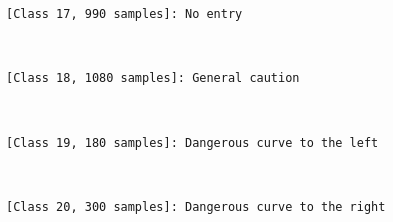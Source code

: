 \documentclass[11pt]{article}
\begin{document}
    \begin{Verbatim}[commandchars=\\\{\}]
[Class 17, 990 samples]: No entry

    \end{Verbatim}

    \begin{center}
    \end{center}
    { \hspace*{\fill} \\}
    
    \begin{Verbatim}[commandchars=\\\{\}]
[Class 18, 1080 samples]: General caution

    \end{Verbatim}

    \begin{center}
    \end{center}
    { \hspace*{\fill} \\}
    
    \begin{Verbatim}[commandchars=\\\{\}]
[Class 19, 180 samples]: Dangerous curve to the left

    \end{Verbatim}

    \begin{center}
    \end{center}
    { \hspace*{\fill} \\}
    
    \begin{Verbatim}[commandchars=\\\{\}]
[Class 20, 300 samples]: Dangerous curve to the right

    \end{Verbatim}

    \begin{center}
    \end{center}
    { \hspace*{\fill} \\}
    
\end{document}
